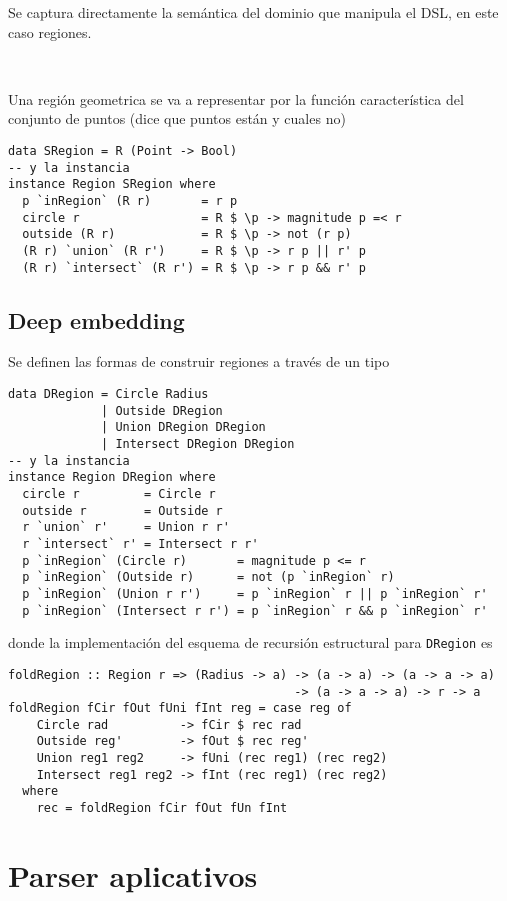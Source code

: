 \documentclass{article}
\begin{document}
Se captura directamente la semántica del dominio que manipula el DSL, en este caso regiones.

\

Una región geometrica se va a representar por la función característica del conjunto de puntos (dice que puntos están y cuales no)

\begin{lstlisting}
data SRegion = R (Point -> Bool)
-- y la instancia
instance Region SRegion where
  p `inRegion` (R r)       = r p
  circle r                 = R $ \p -> magnitude p =< r
  outside (R r)            = R $ \p -> not (r p)
  (R r) `union` (R r')     = R $ \p -> r p || r' p
  (R r) `intersect` (R r') = R $ \p -> r p && r' p
\end{lstlisting}

\subsection{Deep embedding}

Se definen las formas de construir regiones a través de un tipo

\begin{lstlisting}
data DRegion = Circle Radius
             | Outside DRegion
             | Union DRegion DRegion
             | Intersect DRegion DRegion
-- y la instancia
instance Region DRegion where
  circle r         = Circle r
  outside r        = Outside r
  r `union` r'     = Union r r'
  r `intersect` r' = Intersect r r'
  p `inRegion` (Circle r)       = magnitude p <= r
  p `inRegion` (Outside r)      = not (p `inRegion` r)
  p `inRegion` (Union r r')     = p `inRegion` r || p `inRegion` r'
  p `inRegion` (Intersect r r') = p `inRegion` r && p `inRegion` r'
\end{lstlisting}

donde la implementación del esquema de recursión estructural para \texttt{DRegion} es

\begin{lstlisting}
foldRegion :: Region r => (Radius -> a) -> (a -> a) -> (a -> a -> a) 
                                        -> (a -> a -> a) -> r -> a
foldRegion fCir fOut fUni fInt reg = case reg of
    Circle rad          -> fCir $ rec rad
    Outside reg'        -> fOut $ rec reg'
    Union reg1 reg2     -> fUni (rec reg1) (rec reg2)
    Intersect reg1 reg2 -> fInt (rec reg1) (rec reg2)
  where
    rec = foldRegion fCir fOut fUn fInt
\end{lstlisting}

\section{Parser aplicativos}\label{sec:parser_aplicativos}
\end{document}
